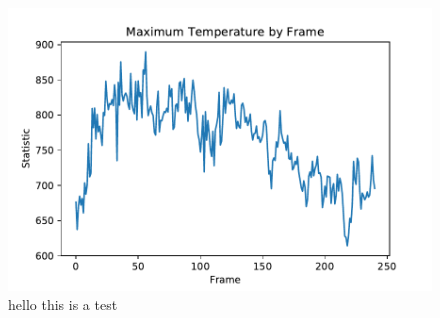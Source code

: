 \documentclass{article}
\begin{document}
\begin{figure}
\centering
\includegraphics{../plots/f1_maxtemp.pdf}
\caption{hello this is a test}

\end{figure}
\end{document}
